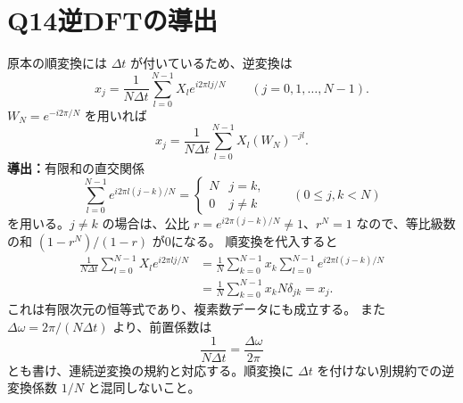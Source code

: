 \documentclass[a4paper,11pt]{article}
\newcommand{\Q}[2]{\section*{Q#1\quad #2}}
\begin{document}
\Q{14}{逆DFTの導出}
原本の順変換には $\Delta t$ が付いているため、逆変換は
\[
\boxed{x_j=\frac1{N\Delta t}\sum_{l=0}^{N-1}X_l
 e^{i2\pi lj/N}\qquad(j=0,1,\ldots,N-1)}.
\]
$W_N=e^{-i2\pi/N}$ を用いれば
\[
\boxed{x_j=\frac1{N\Delta t}\sum_{l=0}^{N-1}X_l(W_N)^{-jl}}.
\]
\textbf{導出：}有限和の直交関係
\[
\sum_{l=0}^{N-1}e^{i2\pi l(j-k)/N}
=\begin{cases}N&j=k,\\0&j\ne k\end{cases}
\qquad(0\leq j,k<N)
\]
を用いる。$j\ne k$ の場合は、公比 $r=e^{i2\pi(j-k)/N}\ne1$、$r^N=1$ なので、等比級数の和 $(1-r^N)/(1-r)$ が0になる。
順変換を代入すると
\begin{align*}
\frac1{N\Delta t}\sum_{l=0}^{N-1}X_le^{i2\pi lj/N}
&=\frac1N\sum_{k=0}^{N-1}x_k
\sum_{l=0}^{N-1}e^{i2\pi l(j-k)/N}\\
&=\frac1N\sum_{k=0}^{N-1}x_kN\delta_{jk}=x_j.
\end{align*}
これは有限次元の恒等式であり、複素数データにも成立する。
また $\Delta\omega=2\pi/(N\Delta t)$ より、前置係数は
\[
\frac1{N\Delta t}=\frac{\Delta\omega}{2\pi}
\]
とも書け、連続逆変換の規約と対応する。順変換に $\Delta t$ を付けない別規約での逆変換係数 $1/N$ と混同しないこと。

\vfill
{}
\end{document}
